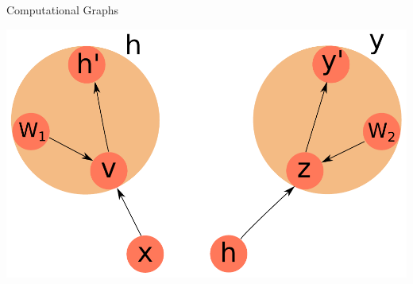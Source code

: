 \documentclass[10pt]{beamer}
\begin{document}
\begin{frame}[fragile]{Computational Graphs}
\begin{center}
\includegraphics[scale=0.70]{images/CompGraph3.pdf}
\end{center}
\end{frame}
\end{document}
